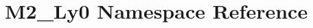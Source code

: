 \hypertarget{namespaceM2__Ly0}{}\section{M2\+\_\+\+Ly0 Namespace Reference}
\label{namespaceM2__Ly0}

